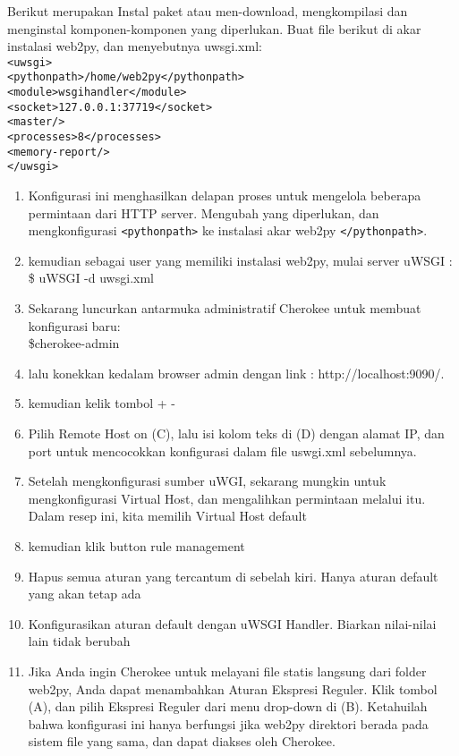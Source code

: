 	 Berikut merupakan Instal paket atau men-download, mengkompilasi dan menginstal komponen-komponen yang diperlukan.
Buat file berikut di akar instalasi web2py, dan menyebutnya uwsgi.xml:\\
\verb|<uwsgi>| 
\\ \verb|<pythonpath>/home/web2py</pythonpath>|
\\ \verb|<module>wsgihandler</module>|
\\ \verb|<socket>127.0.0.1:37719</socket>|
\\ \verb|<master/>|
\\ \verb|<processes>8</processes>|
\\ \verb|<memory-report/>|
\\ \verb|</uwsgi>|

\begin{enumerate}
\item Konfigurasi ini menghasilkan delapan proses untuk mengelola beberapa permintaan dari
HTTP server. Mengubah yang diperlukan, dan mengkonfigurasi \verb|<pythonpath>| ke instalasi
akar web2py \verb|</pythonpath>|.
\item kemudian sebagai user yang memiliki instalasi web2py, mulai server uWSGI :\\ \$ uWSGI -d uwsgi.xml
\item Sekarang luncurkan antarmuka administratif Cherokee untuk membuat konfigurasi baru:\\ \$cherokee-admin
\item lalu konekkan kedalam browser admin dengan link : http://localhost:9090/.
\item kemudian kelik tombol + -
\item Pilih Remote Host on (C), lalu isi kolom teks di (D) dengan alamat IP, dan port untuk mencocokkan konfigurasi dalam file uswgi.xml sebelumnya.
\item Setelah mengkonfigurasi sumber uWGI, sekarang mungkin untuk mengkonfigurasi Virtual Host, dan
mengalihkan permintaan melalui itu. Dalam resep ini, kita memilih Virtual Host default
\item kemudian klik button rule management
\item Hapus semua aturan yang tercantum di sebelah kiri. Hanya aturan default yang akan tetap ada
\item Konfigurasikan aturan default dengan uWSGI Handler. Biarkan nilai-nilai lain tidak berubah
\item Jika Anda ingin Cherokee untuk melayani file statis langsung dari folder web2py, Anda dapat menambahkan Aturan Ekspresi Reguler. Klik tombol (A), dan pilih Ekspresi Reguler dari menu drop-down di (B). Ketahuilah bahwa konfigurasi ini hanya berfungsi jika web2py direktori berada pada sistem file yang sama, dan dapat diakses oleh Cherokee.

\end{enumerate}
